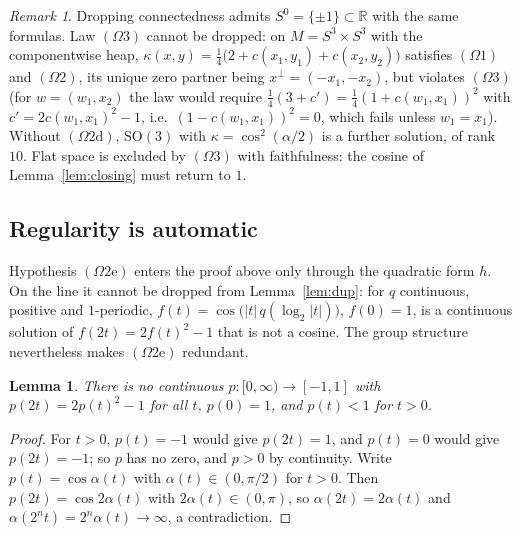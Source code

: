 \documentclass[11pt,reqno]{amsart}
\newtheorem{lemma}[theorem]{Lemma}
\theoremstyle{definition}
\theoremstyle{remark}
\newtheorem{remark}[theorem]{Remark}
\numberwithin{equation}{section}
\newcommand{\R}{\mathbb{R}}
\newcommand{\SO}{\mathrm{SO}}
\begin{document}
\begin{remark}
Dropping connectedness admits $S^0=\{\pm1\}\subset\R$ with the same formulas.  Law $(\Omega3)$ cannot be
dropped: on $M=S^3\times S^3$ with the componentwise heap, $\kappa(x,y)=\tfrac14\bigl(2+c(x_1,y_1)+c(x_2,y_2)\bigr)$
satisfies $(\Omega1)$ and $(\Omega2)$, its unique zero partner being $x^\perp=(-x_1,-x_2)$, but violates $(\Omega3)$
(for $w=(w_1,x_2)$ the law would require $\tfrac14(3+c')=\tfrac14(1+c(w_1,x_1))^2$ with
$c'=2c(w_1,x_1)^2-1$, i.e.\ $(1-c(w_1,x_1))^2=0$, which fails unless $w_1=x_1$).  Without $(\Omega2\mathrm d)$,
$\SO(3)$ with $\kappa=\cos^2(\alpha/2)$ is a further solution, of rank $10$.  Flat space is excluded by
$(\Omega3)$ with faithfulness: the cosine of Lemma~\ref{lem:closing} must return to $1$.
\end{remark}

\subsection{Regularity is automatic}\label{sec:regularity}
Hypothesis $(\Omega2\mathrm e)$ enters the proof above only through the quadratic form $h$.  On the line it cannot be
dropped from Lemma~\ref{lem:dup}: for $q$ continuous, positive and $1$-periodic, $f(t)=\cos\bigl(\lvert t\rvert\,q(\log_2\lvert t\rvert)\bigr)$,
$f(0)=1$, is a continuous solution of $f(2t)=2f(t)^2-1$ that is not a cosine.  The group structure nevertheless
makes $(\Omega2\mathrm e)$ redundant.

\begin{lemma}\label{lem:noline}
There is no continuous $p\colon[0,\infty)\to[-1,1]$ with $p(2t)=2p(t)^2-1$ for all $t$, $p(0)=1$, and $p(t)<1$ for $t>0$.
\end{lemma}
\begin{proof}
For $t>0$, $p(t)=-1$ would give $p(2t)=1$, and $p(t)=0$ would give $p(2t)=-1$; so $p$ has no zero, and $p>0$ by
continuity.  Write $p(t)=\cos\alpha(t)$ with $\alpha(t)\in(0,\pi/2)$ for $t>0$.  Then $p(2t)=\cos2\alpha(t)$ with
$2\alpha(t)\in(0,\pi)$, so $\alpha(2t)=2\alpha(t)$ and $\alpha(2^nt)=2^n\alpha(t)\to\infty$, a contradiction.
\end{proof}
\end{document}
